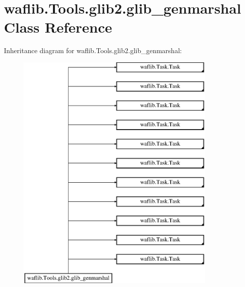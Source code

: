 \hypertarget{classwaflib_1_1_tools_1_1glib2_1_1glib__genmarshal}{}\section{waflib.\+Tools.\+glib2.\+glib\+\_\+genmarshal Class Reference}
\label{classwaflib_1_1_tools_1_1glib2_1_1glib__genmarshal}
Inheritance diagram for waflib.\+Tools.\+glib2.\+glib\+\_\+genmarshal\+:\begin{figure}[H]
\begin{center}
\leavevmode
\includegraphics[height=12.000000cm]{classwaflib_1_1_tools_1_1glib2_1_1glib__genmarshal}
\end{center}
\end{figure}
